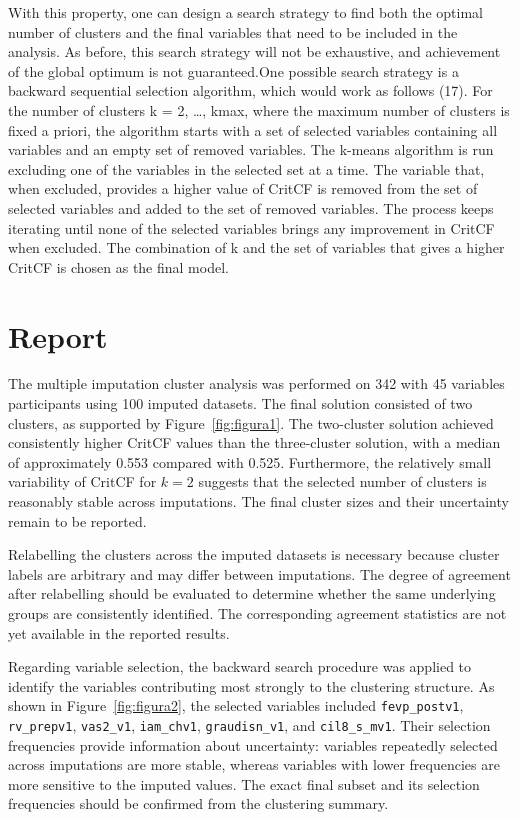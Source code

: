 \documentclass[10pt,a4paper,twoside]{article}\usepackage[]{graphicx}\usepackage[]{xcolor}
\begin{document}
With this property, one can design a search strategy to find both the optimal number of clusters and the final variables that need to be included in the analysis. As before, this search strategy will not be exhaustive, and achievement of the global optimum is not guaranteed.One possible search strategy is a backward sequential selection algorithm, which would work as follows (17). For the number of clusters k = 2, …, kmax, where the maximum number of clusters is fixed a priori, the algorithm starts  with a set of selected variables containing all variables and an empty set of  removed variables. The k-means algorithm is run excluding one of the variables in the selected set at a time. The variable that, when excluded, provides a higher value of CritCF is removed from the set of selected variables and added to the set  of removed variables. The process keeps iterating until none of the selected variables brings any improvement in CritCF when excluded. The combination of k and the set of variables that gives a higher CritCF is chosen as the final model.


\section{Report}

The multiple imputation cluster analysis was performed on 342 with 45 variables participants using 100 imputed datasets. The final solution consisted of two clusters, as supported by Figure~\ref{fig:figura1}. The two-cluster solution achieved consistently higher CritCF values than the three-cluster solution, with a median of approximately 0.553 compared with 0.525. Furthermore, the relatively small variability of CritCF for $k=2$ suggests that the selected number of clusters is reasonably stable across imputations. The final cluster sizes and their uncertainty remain to be reported.

Relabelling the clusters across the imputed datasets is necessary because cluster labels are arbitrary and may differ between imputations. The degree of agreement after relabelling should be evaluated to determine whether the same underlying groups are consistently identified. The corresponding agreement statistics are not yet available in the reported results.

Regarding variable selection, the backward search procedure
was applied to identify the variables contributing most
strongly to the clustering structure. As shown in
Figure~\ref{fig:figura2}, the selected variables included
\texttt{fevp\_postv1}, \texttt{rv\_prepv1},
\texttt{vas2\_v1}, \texttt{iam\_chv1},
\texttt{graudisn\_v1}, and \texttt{cil8\_s\_mv1}.
Their selection frequencies provide information about
uncertainty: variables repeatedly selected across imputations
are more stable, whereas variables with lower frequencies
are more sensitive to the imputed values. The exact final
subset and its selection frequencies should be confirmed
from the clustering summary.
\end{document}
